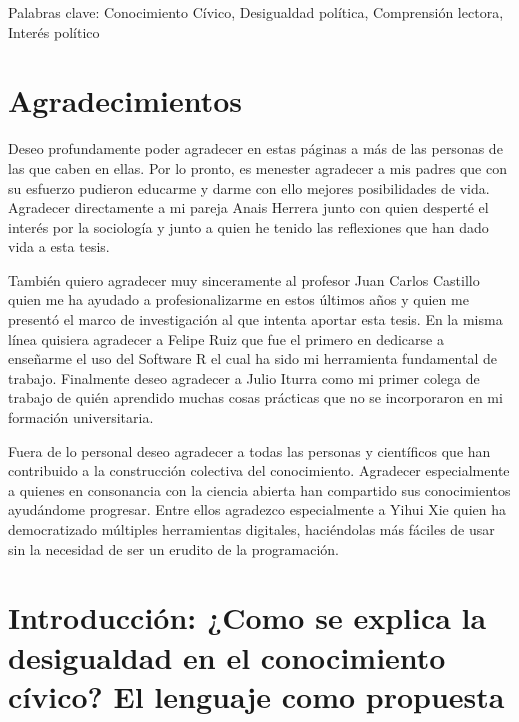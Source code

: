 \documentclass[12pt,twoside]{templates/facsothesis}
\begin{document}
Palabras clave: Conocimiento Cívico, Desigualdad política, Comprensión lectora, Interés político

\hypertarget{agradecimientos}{%
\chapter*{Agradecimientos}\label{agradecimientos}}

Deseo profundamente poder agradecer en estas páginas a más de las personas de las que caben en ellas. Por lo pronto, es menester agradecer a mis padres que con su esfuerzo pudieron educarme y darme con ello mejores posibilidades de vida.
Agradecer directamente a mi pareja Anais Herrera junto con quien desperté el interés por la sociología y junto a quien he tenido las reflexiones que han dado vida a esta tesis.

También quiero agradecer muy sinceramente al profesor Juan Carlos Castillo quien me ha ayudado a profesionalizarme en estos últimos años y quien me presentó el marco de investigación al que intenta aportar esta tesis. En la misma línea quisiera agradecer a Felipe Ruiz que fue el primero en dedicarse a enseñarme el uso del Software R el cual ha sido mi herramienta fundamental de trabajo. Finalmente deseo agradecer a Julio Iturra como mi primer colega de trabajo de quién aprendido muchas cosas prácticas que no se incorporaron en mi formación universitaria.

Fuera de lo personal deseo agradecer a todas las personas y científicos que han contribuido a la construcción colectiva del conocimiento. Agradecer especialmente a quienes en consonancia con la ciencia abierta han compartido sus conocimientos ayudándome progresar. Entre ellos agradezco especialmente a Yihui Xie quien ha democratizado múltiples herramientas digitales, haciéndolas más fáciles de usar sin la necesidad de ser un erudito de la programación.

\hypertarget{introducciuxf3n-como-se-explica-la-desigualdad-en-el-conocimiento-cuxedvico-el-lenguaje-como-propuesta}{%
\chapter{Introducción: ¿Como se explica la desigualdad en el conocimiento cívico? El lenguaje como propuesta}\label{introducciuxf3n-como-se-explica-la-desigualdad-en-el-conocimiento-cuxedvico-el-lenguaje-como-propuesta}}
\end{document}
